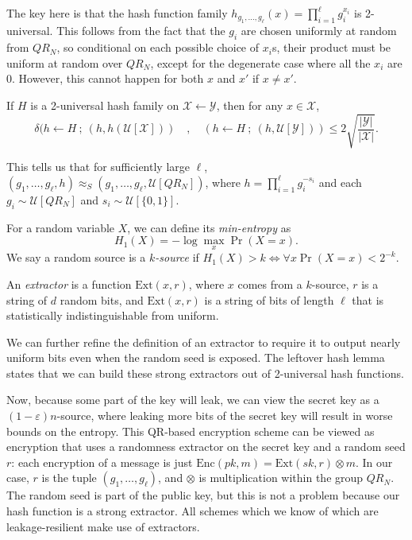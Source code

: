 \documentclass[10pt]{article}
\newcommand{\bit}{\{0,1\}}
\newcommand{\unif}[1]{\mathcal{U}\left[{#1}\right]}
\newcommand{\then}{\ ;\ }
\begin{document}
The key here is that the hash function family $h_{g_1,\dots,g_\ell}(x) = \prod_{i=1}^\ell g_i ^ {x_i}$ is 2-universal. This follows from the fact that the $g_i$ are chosen uniformly at random from $QR_N$, so conditional on each possible choice of $x_i$s, their product must be uniform at random over $QR_N$, except for the degenerate case where all the $x_i$ are $0$. However, this cannot happen for both $x$ and $x'$ if $x \neq x'$.

\begin{lemma}
If $H$ is a 2-universal hash family on $\mathcal{X} \leftarrow \mathcal{Y}$, then for any $x \in \mathcal{X}$,
\[
\delta(h \leftarrow H \then (h,h(\unif{\mathcal{X}})) \quad, \quad 
         (h \leftarrow H \then (h,\unif{\mathcal{Y}})) \le 2\sqrt{\frac{|\mathcal{Y}|}{|\mathcal{X}|}}.
\]
\end{lemma}

This tells us that for sufficiently large $\ell$, $(g_1,\dots,g_\ell,h) \approx_S (g_1,\dots,g_\ell,\unif{QR_N})$, where $h = \prod_{i=1}^\ell g_i^{-s_i}$ and each $g_i \sim \unif{QR_N}$ and $s_i \sim \unif{\bit}$.

\begin{definition}
For a random variable $X$, we can define its \emph{min-entropy} as 
\[
H_1(X) = -\log \max_x \Pr(X = x).
\]
We say a random source is a \emph{$k$-source} if $H_1(X) > k \iff \forall x \Pr(X = x) < 2^{-k}$.
\end{definition}

\begin{definition}
An \emph{extractor} is a function $\mathrm{Ext}(x,r)$, where $x$ comes from a $k$-source, $r$ is a string of $d$ random bits, and $\mathrm{Ext}(x,r)$ is a string of bits of length $\ell$ that is statistically indistinguishable from uniform.
\end{definition}

We can further refine the definition of an extractor to require it to output nearly uniform bits even when the random seed is exposed. The leftover hash lemma states that we can build these strong extractors out of 2-universal hash functions.


Now, because some part of the key will leak, we can view the secret key as a $(1-\varepsilon)n$-source, where leaking more bits of the secret key will result in worse bounds on the entropy. This QR-based encryption scheme can be viewed as encryption that uses a randomness extractor on the secret key and a random seed $r$: each encryption of a message is just $\mathrm{Enc}(pk,m) = \mathrm{Ext}(sk,r) \otimes m$. In our case, $r$ is the tuple $(g_1,\dots,g_\ell)$, and $\otimes$ is multiplication within the group $QR_N$. The random seed is part of the public key, but this is not a problem because our hash
function is a strong extractor. All schemes which we know of which are leakage-resilient make
use of extractors.
\end{document}
